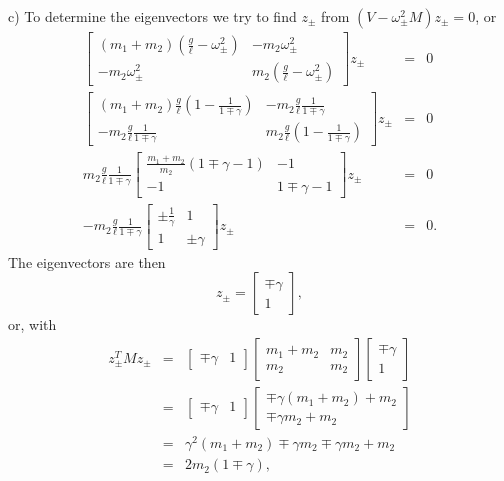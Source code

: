 \documentclass[letterpaper,11pt]{article}
\begin{document}
c) To determine the eigenvectors we try to find $z_\pm$ from $(V - \omega_\pm^2 M)z_\pm = 0$, or
\begin{eqnarray*}
 \left[ \begin{array}{cc}
  (m_1 + m_2) \left(\frac{g}{\ell} - \omega_\pm^2\right) & - m_2 \omega_\pm^2 \\
  - m_2 \omega_\pm^2 & m_2 \left(\frac{g}{\ell} - \omega_\pm^2\right)
 \end{array} \right] z_\pm & = & 0 \\
 \left[ \begin{array}{cc}
  (m_1 + m_2) \frac{g}{\ell}\left(1 - \frac{1}{1 \mp \gamma}\right) & - m_2 \frac{g}{\ell} \frac{1}{1 \mp \gamma} \\
  - m_2 \frac{g}{\ell} \frac{1}{1 \mp \gamma} & m_2 \frac{g}{\ell} \left( 1 - \frac{1}{1 \mp \gamma} \right)
 \end{array} \right] z_\pm & = & 0 \\
 m_2 \frac{g}{\ell} \frac{1}{1 \mp \gamma} \left[ \begin{array}{cc}
  \frac{m_1 + m_2}{m_2} \left(1 \mp \gamma - 1\right) & - 1 \\
  - 1 & 1 \mp \gamma - 1
 \end{array} \right] z_\pm & = & 0 \\
 - m_2 \frac{g}{\ell} \frac{1}{1 \mp \gamma} \left[ \begin{array}{cc}
  \pm \frac{1}{\gamma} & 1 \\
  1 & \pm \gamma
 \end{array} \right] z_\pm & = & 0.
\end{eqnarray*}
The eigenvectors are then
\begin{equation*}
 z_\pm = \left[ \begin{array}{c} \mp \gamma \\ 1 \end{array} \right],
\end{equation*}
or, with
\begin{eqnarray*}
 z_\pm^T M z_\pm
   & = & \left[ \begin{array}{cc} \mp \gamma & 1 \end{array} \right]
         \left[ \begin{array}{cc}
          m_1 + m_2 & m_2 \\
          m_2 & m_2
         \end{array} \right]
         \left[ \begin{array}{c} \mp \gamma \\ 1 \end{array} \right] \\
   & = & \left[ \begin{array}{cc} \mp \gamma & 1 \end{array} \right]
         \left[ \begin{array}{c} \mp \gamma (m_1 + m_2) + m_2 \\ \mp \gamma m_2 + m_2 \end{array} \right] \\
   & = & \gamma^2 (m_1 + m_2) \mp \gamma m_2 \mp \gamma m_2 + m_2 \\
   & = & 2 m_2 (1 \mp \gamma),
\end{eqnarray*}
\end{document}
